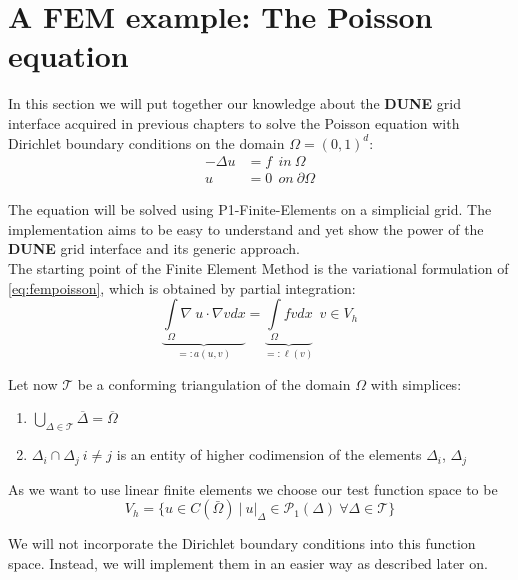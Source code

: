 \documentclass[11pt,a4paper,headinclude,footinclude,DIV16,normalheadings]{scrreprt}
\newcommand{\Dune}{{\sf\bfseries DUNE}\xspace}
\begin{document}
\section{A FEM example: The Poisson equation}
\label{Sec:FEMPoisson}

In this section we will put together our knowledge about the \Dune{} grid interface acquired in previous chapters to solve the Poisson equation with Dirichlet boundary conditions on the domain $\Omega = (0,1)^d$:
\begin{align} \label{eq:fempoisson}
 -\Delta u & = f \ \ in \ \Omega\\
u & = 0 \ \ on \ \partial\Omega
\end{align}

The equation will be solved using P1-Finite-Elements on a simplicial grid. The implementation aims to be easy to understand and yet show the power of the \Dune{} grid interface and its generic approach. \\

The starting point of the Finite Element Method is the variational formulation of \ref{eq:fempoisson}, which is obtained by partial integration:
\begin{equation}
\underbrace{\int\limits_{\Omega}\nabla\ u\cdot\nabla v dx}_{ =:a(u,v)}
= \underbrace{\int\limits_{\Omega} fv dx}_{=:\ell (v)} \ \ v\in V_h
\end{equation}

Let now $\mathcal{T}$ be a conforming triangulation of the domain $\Omega$ with simplices:

\renewcommand{\labelenumi}{(\roman{enumi})}
\begin{center}
\begin{enumerate}
 \item $\bigcup\limits_{\Delta\in\mathcal{T}} \overline{\Delta} = \overline{\Omega}$
 \item $\Delta_i\cap\Delta_j \ i\neq j$ is an entity of 
higher codimension of the elements $\Delta_i$, $\Delta_j$
\end{enumerate}
\end{center}

As we want to use linear finite elements we choose our test function space to be
\begin{equation}
 V_h = \{ u\in C(\bar{\Omega} )\ \Big| \ u\big|_{\Delta}\in\mathcal{P}_1 (\Delta ) \ \forall\Delta\in\mathcal{T}\}
\end{equation}

We will not incorporate the Dirichlet boundary conditions into this function space. Instead, we will implement them in an easier way as described later on. \\
\end{document}
